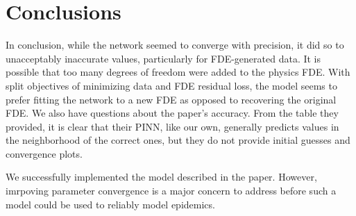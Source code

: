 \documentclass{article}
\begin{document}
	\section{Conclusions}
	\label{section:Conclusions}
	
	In conclusion, while the network seemed to converge with precision, it did so to unacceptably inaccurate values, particularly for FDE-generated data. It is possible that too many degrees of freedom were added to the physics FDE. With split objectives of minimizing data and FDE residual loss, the model seems to prefer fitting the network to a new FDE as opposed to recovering the original FDE. We also have questions about the paper's accuracy. From the table they provided, it is clear that their PINN, like our own, generally predicts values in the neighborhood of the correct ones, but they do not provide initial guesses and convergence plots.
	
	We successfully implemented the model described in the paper. However, imrpoving parameter convergence is a major concern to address before such a model could be used to reliably model epidemics.
	
	
	
\end{document}
